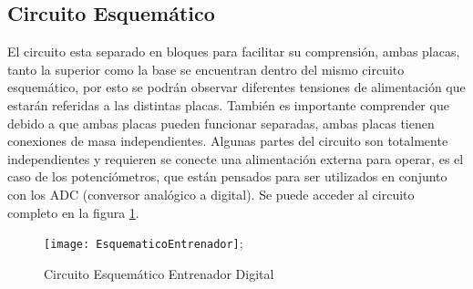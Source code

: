 \subsection{Circuito Esquemático}
El circuito esta separado en bloques para facilitar su comprensión, ambas placas, tanto la superior como la base se encuentran dentro del mismo circuito esquemático, por esto se podrán observar diferentes tensiones de alimentación que estarán referidas a las distintas placas. También es importante comprender que debido a que ambas placas pueden funcionar separadas, ambas placas tienen conexiones de masa independientes. Algunas partes del circuito son totalmente independientes y requieren se conecte una alimentación externa para operar, es el caso de los potenciómetros, que están pensados para ser utilizados en conjunto con los ADC (conversor analógico a digital). Se puede acceder al circuito completo en la figura \ref{CircuitoEntrenador}. %
\begin{figure}
	\centering\texttt{[image: EsquematicoEntrenador]};
	\caption{Circuito Esquemático Entrenador Digital}
	\label{CircuitoEntrenador}
\end{figure}%
